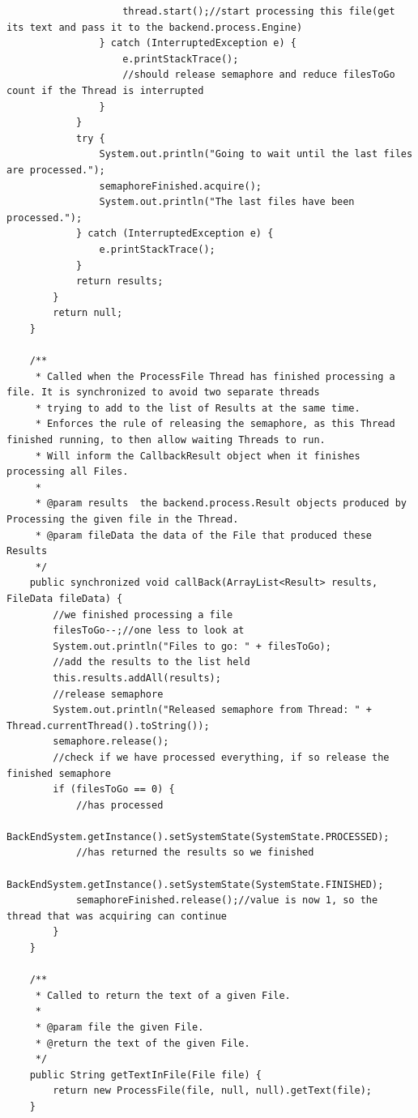 \begin{lstlisting}
                    thread.start();//start processing this file(get its text and pass it to the backend.process.Engine)
                } catch (InterruptedException e) {
                    e.printStackTrace();
                    //should release semaphore and reduce filesToGo count if the Thread is interrupted
                }
            }
            try {
                System.out.println("Going to wait until the last files are processed.");
                semaphoreFinished.acquire();
                System.out.println("The last files have been processed.");
            } catch (InterruptedException e) {
                e.printStackTrace();
            }
            return results;
        }
        return null;
    }

    /**
     * Called when the ProcessFile Thread has finished processing a file. It is synchronized to avoid two separate threads
     * trying to add to the list of Results at the same time.
     * Enforces the rule of releasing the semaphore, as this Thread finished running, to then allow waiting Threads to run.
     * Will inform the CallbackResult object when it finishes processing all Files.
     *
     * @param results  the backend.process.Result objects produced by Processing the given file in the Thread.
     * @param fileData the data of the File that produced these Results
     */
    public synchronized void callBack(ArrayList<Result> results, FileData fileData) {
        //we finished processing a file
        filesToGo--;//one less to look at
        System.out.println("Files to go: " + filesToGo);
        //add the results to the list held
        this.results.addAll(results);
        //release semaphore
        System.out.println("Released semaphore from Thread: " + Thread.currentThread().toString());
        semaphore.release();
        //check if we have processed everything, if so release the finished semaphore
        if (filesToGo == 0) {
            //has processed
            BackEndSystem.getInstance().setSystemState(SystemState.PROCESSED);
            //has returned the results so we finished
            BackEndSystem.getInstance().setSystemState(SystemState.FINISHED);
            semaphoreFinished.release();//value is now 1, so the thread that was acquiring can continue
        }
    }

    /**
     * Called to return the text of a given File.
     *
     * @param file the given File.
     * @return the text of the given File.
     */
    public String getTextInFile(File file) {
        return new ProcessFile(file, null, null).getText(file);
    }


\end{lstlisting}
